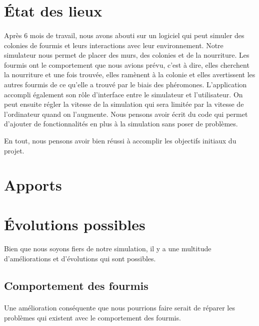\documentclass{EPUProjetDi}
\begin{document}
\section{État des lieux}

\paragraph{}
Après 6 mois de travail, nous avons abouti sur un logiciel qui peut simuler des colonies de fourmis et leurs interactions avec leur environnement.
Notre simulateur nous permet de placer des murs, des colonies et de la nourriture. 
Les fourmis ont le comportement que nous avions prévu, c'est à dire, elles cherchent la nourriture et une fois trouvée, elles ramènent à la colonie et elles avertissent les 
autres fourmis de ce qu'elle a trouvé par le biais des phéromones.
L'application accompli également son rôle d'interface entre le simulateur et l'utilisateur. On peut ensuite régler la vitesse de la simulation qui sera limitée par la vitesse de l'ordinateur quand on l'augmente.
Nous pensons avoir écrit du code qui permet d'ajouter de fonctionnalités en plus à la simulation sans poser de problèmes.

En tout, nous pensons avoir bien réussi à accomplir les objectifs initiaux du projet.

\section{Apports}

\section{Évolutions possibles}

\paragraph{}
Bien que nous soyons fiers de notre simulation, il y a une multitude d'améliorations et d'évolutions qui sont possibles.

\subsection{Comportement des fourmis}
\paragraph{}
Une amélioration conséquente que nous pourrions faire serait de réparer les problèmes qui existent avec le comportement des fourmis.
\end{document}
